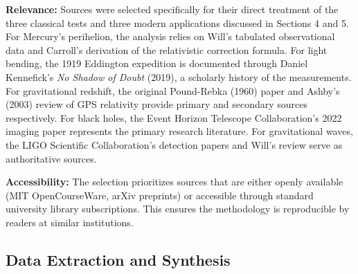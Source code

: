 \documentclass[12pt, a4paper]{article}
\begin{document}
	\textbf{Relevance:} Sources were selected specifically for their direct treatment of the three classical tests and three modern applications discussed in Sections 4 and 5. For Mercury's perihelion, the analysis relies on Will's tabulated observational data and Carroll's derivation of the relativistic correction formula. For light bending, the 1919 Eddington expedition is documented through Daniel Kennefick's \textit{No Shadow of Doubt} (2019), a scholarly history of the measurements. For gravitational redshift, the original Pound-Rebka (1960) paper and Ashby's (2003) review of GPS relativity provide primary and secondary sources respectively. For black holes, the Event Horizon Telescope Collaboration's 2022 imaging paper represents the primary research literature. For gravitational waves, the LIGO Scientific Collaboration's detection papers and Will's review serve as authoritative sources.

	\textbf{Accessibility:} The selection prioritizes sources that are either openly available (MIT OpenCourseWare, arXiv preprints) or accessible through standard university library subscriptions. This ensures the methodology is reproducible by readers at similar institutions.

	\subsection{Data Extraction and Synthesis}
 
\end{document}
